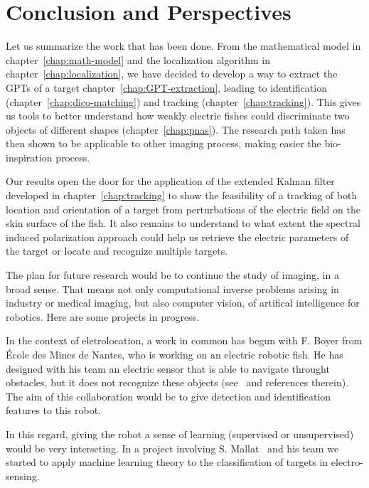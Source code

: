 \chapter{Conclusion and Perspectives}

Let us summarize the work that has been done. From the mathematical model
in chapter~\ref{chap:math-model} and the localization algorithm in chapter~\ref{chap:localization},
we have decided to develop a way to extract the GPTs of a target
chapter~\ref{chap:GPT-extraction}, leading to identification (chapter~\ref{chap:dico-matching})
and tracking (chapter~\ref{chap:tracking}). This gives us tools to better understand
how weakly electric fishes could discriminate two objects of different shapes
(chapter~\ref{chap:pnas}).
The research path taken has then shown to be applicable to other imaging process,
making easier the bio-inspiration process. 

Our results open the door for the application of the extended
Kalman filter developed in chapter~\ref{chap:tracking} to show the
feasibility of a tracking of both location and orientation of a
target from perturbations of the electric field on the skin
surface of the fish. It also remains to understand to what extent
the spectral induced polarization approach could help us retrieve
the electric parameters of the target or locate and recognize
multiple targets.

The plan for future research would be to continue the study of imaging, in a broad sense.
That means not only computational inverse problems arising in industry or medical 
imaging, but also computer vision, of artifical intelligence for robotics. Here are 
some projects in progress.

In the context of eletrolocation, a work in common has begun with F. Boyer from
\'Ecole des Mines de Nantes, who is working on an electric robotic fish. He has
designed with his team an electric sensor that is able to navigate throught obstacles,
but it does not recognize these objects (see~\cite{lebastard2012underwater} and references therein).
The aim of this collaboration would be to give detection and identification features to this robot.

In this regard, giving the robot a sense of learning (supervised or unsupervised)
would be very interseting. In a project involving S. Mallat~\cite{mallat1999wavelet} and
his team we started to apply machine learning theory to the classification of targets in electro-sensing.

